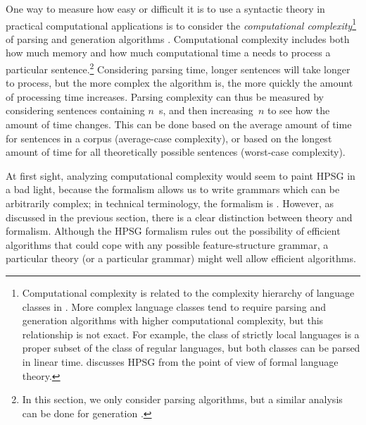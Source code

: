 \documentclass[output=paper
                ,modfonts
                ,nonflat
	        ,collection
	        ,collectionchapter
	        ,collectiontoclongg
 	        ,biblatex
                ,babelshorthands
                ,newtxmath
                ,draftmode
                ,colorlinks, citecolor=brown
]{./langsci/langscibook}
\begin{document}
One way to measure how easy or difficult it is
to use a syntactic theory in practical computational applications
is to consider the \textit{computational complexity}\footnote{%
	Computational complexity is related to
	the complexity hierarchy of language classes in .
	More complex language classes tend to require
	parsing and generation algorithms with higher computational complexity,
	but this relationship is not exact.
	For example, the class of strictly local languages is a proper subset of the class of regular languages,
	but both classes can be parsed in linear time.
	\citet[Chapter 17]{MuellerGT-Eng3} discusses HPSG from the point of view of formal language theory.
}
of parsing and generation algorithms \citep{gazdar1985complexity}.
Computational complexity includes both how much memory
and how much computational time
a  needs to process a particular sentence.\footnote{%
  In this section, we only consider parsing
  algorithms, but a similar analysis can be done for generation
  \citep[\eg][]{carroll1999generate}.}
Considering parsing time, longer sentences will take longer to process,
but the more complex the algorithm is,
the more quickly the amount of processing time increases.
Parsing complexity can thus be measured by considering
sentences containing $n$~s,
and then increasing~$n$ to see how the amount of time changes.
This can be done based on the average amount of time
for sentences in a corpus (average-case complexity),
or based on the longest amount of time
for all theoretically possible sentences (worst-case complexity).

At first sight, analyzing computational complexity
would seem to paint HPSG in a bad light,
because the formalism allows us to write grammars
which can be arbitrarily complex;
in technical terminology, the formalism is \textit{}
\citep[Section~3.4]{Johnson88}.
However, as discussed in the previous section,
there is a clear distinction between theory and formalism.
Although the HPSG formalism rules out the possibility of efficient algorithms
that could cope with any possible feature-structure grammar,
a particular theory (or a particular grammar) might well allow efficient algorithms.
\end{document}
